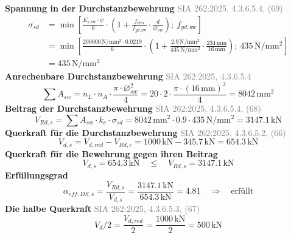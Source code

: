 \documentclass[11pt,a4paper]{article}
\newcommand{\normref}[1]{{\small\textcolor{gray}{#1}}}
\begin{document}
\noindent\textbf{Spannung in der Durchstanzbewehrung} \hfill \normref{SIA 262:2025, 4.3.6.5.4, (69)}
\begin{equation*}
\begin{aligned}
  \sigma_{sd} &= \min\left[\frac{E_{s,\text{sw}} \cdot \psi}{6} \cdot \left(1 + \frac{f_{ctm}}{f_{yd,\text{sw}}} \cdot \frac{d}{\varnothing_{sw}}\right);\ f_{yd,\text{sw}}\right] \\
  &= \min\left[\frac{200000\,\mathrm{N}/\mathrm{mm}^{2} \cdot 0.0219}{6} \cdot \left(1 + \frac{2.9\,\mathrm{N}/\mathrm{mm}^{2}}{435\,\mathrm{N}/\mathrm{mm}^{2}} \cdot \frac{234\,\mathrm{mm}}{16\,\mathrm{mm}}\right);\ 435\,\mathrm{N}/\mathrm{mm}^{2}\right] \\
  &= 435\,\mathrm{N}/\mathrm{mm}^{2}
\end{aligned}
\end{equation*}
\noindent\textbf{Anrechenbare Durchstanzbewehrung} \hfill \normref{SIA 262:2025, 4.3.6.5.4}
\begin{equation*}
\sum A_{sw} = n_L \cdot n_A \cdot \frac{\pi \cdot \varnothing_{sw}^{2}}{4} = 20 \cdot 2 \cdot \frac{\pi \cdot \left(16\,\mathrm{mm}\right)^{2}}{4} = 8042\,\mathrm{mm}^{2}
\end{equation*}
\noindent\textbf{Beitrag der Durchstanzbewehrung} \hfill \normref{SIA 262:2025, 4.3.6.5.4, (68)}
\begin{equation*}
V_{Rd,s} = \sum A_{sw} \cdot k_e \cdot \sigma_{sd} = 8042\,\mathrm{mm}^{2} \cdot 0.9 \cdot 435\,\mathrm{N}/\mathrm{mm}^{2} = 3147.1\,\mathrm{kN}
\end{equation*}
\noindent\textbf{Querkraft für die Durchstanzbewehrung} \hfill \normref{SIA 262:2025, 4.3.6.5.2, (66)}
\begin{equation*}
V_{d,s} = V_{d,red} - V_{Rd,c} = 1000\,\mathrm{kN} - 345.7\,\mathrm{kN} = 654.3\,\mathrm{kN}
\end{equation*}
\noindent\textbf{Querkraft für die Bewehrung gegen ihren Beitrag}
\begin{equation*}
V_{d,s} = 654.3\,\mathrm{kN} \quad \le \quad V_{Rd,s} = 3147.1\,\mathrm{kN}
\end{equation*}
\noindent\textbf{Erfüllungsgrad}
\begin{equation*}
\alpha_{eff,DS,s} = \frac{V_{Rd,s}}{V_{d,s}} = \frac{3147.1\,\mathrm{kN}}{654.3\,\mathrm{kN}} = 4.81 \quad \Rightarrow \quad \text{erfüllt}
\end{equation*}
\noindent\textbf{Die halbe Querkraft} \hfill \normref{SIA 262:2025, 4.3.6.5.3, (67)}
\begin{equation*}
V_d / 2 = \frac{V_{d,red}}{2} = \frac{1000\,\mathrm{kN}}{2} = 500\,\mathrm{kN}
\end{equation*}
\end{document}
